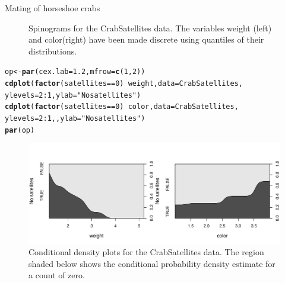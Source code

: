 \documentclass[11pt]{book}\usepackage[]{graphicx}\usepackage[]{color}
\makeatletter
\newcommand{\hlnum}[1]{\textcolor[rgb]{0.686,0.059,0.569}{#1}}%
\newcommand{\hlstr}[1]{\textcolor[rgb]{0.192,0.494,0.8}{#1}}%
\newcommand{\hlopt}[1]{\textcolor[rgb]{0,0,0}{#1}}%
\newcommand{\hlstd}[1]{\textcolor[rgb]{0.345,0.345,0.345}{#1}}%
\newcommand{\hlkwb}[1]{\textcolor[rgb]{0.69,0.353,0.396}{#1}}%
\newcommand{\hlkwc}[1]{\textcolor[rgb]{0.333,0.667,0.333}{#1}}%
\newcommand{\hlkwd}[1]{\textcolor[rgb]{0.737,0.353,0.396}{\textbf{#1}}}%
\newenvironment{kframe}{%
 \def\at@end@of@kframe{}%
 \ifinner\ifhmode%
  \def\at@end@of@kframe{\end{minipage}}%
  \begin{minipage}{\columnwidth}%
 \fi\fi%
 \def\FrameCommand##1{\hskip\@totalleftmargin \hskip-\fboxsep
 \colorbox{shadecolor}{##1}\hskip-\fboxsep
     \hskip-\linewidth \hskip-\@totalleftmargin \hskip\columnwidth}%
 \MakeFramed {\advance\hsize-\width
   \@totalleftmargin\z@ \linewidth\hsize
   \@setminipage}}%
 {\par\unskip\endMakeFramed%
 \at@end@of@kframe}
\newenvironment{knitrout}{}{} %
\renewenvironment{knitrout}{\small\renewcommand{\baselinestretch}{.85}}{} %
\makeatother
\begin{document}
\begin{Example}{Mating of horseshoe crabs}
\begin{knitrout}
\begin{figure}[!htbp]
\caption[Spinograms for the CrabSatellites data]{Spinograms for the CrabSatellites data. The variables weight (left) and color(right) have been made discrete using quantiles of their distributions.\label{fig:crabs-zero-spinogram}}
\end{figure}


\end{knitrout}

\begin{knitrout}
\color{fgcolor}\begin{kframe}
\begin{alltt}
\hlstd{op} \hlkwb{<-} \hlkwd{par}\hlstd{(}\hlkwc{cex.lab}\hlstd{=}\hlnum{1.2}\hlstd{,} \hlkwc{mfrow} \hlstd{=} \hlkwd{c}\hlstd{(}\hlnum{1}\hlstd{,} \hlnum{2}\hlstd{))}
\hlkwd{cdplot}\hlstd{(}\hlkwd{factor}\hlstd{(satellites} \hlopt{==} \hlnum{0}\hlstd{)} \hlopt{~} \hlstd{weight,} \hlkwc{data} \hlstd{= CrabSatellites,}
       \hlkwc{ylevels}\hlstd{=}\hlnum{2}\hlopt{:}\hlnum{1}\hlstd{,} \hlkwc{ylab}\hlstd{=}\hlstr{"No satellites"}\hlstd{)}
\hlkwd{cdplot}\hlstd{(}\hlkwd{factor}\hlstd{(satellites} \hlopt{==} \hlnum{0}\hlstd{)} \hlopt{~} \hlstd{color,} \hlkwc{data} \hlstd{= CrabSatellites,}
       \hlkwc{ylevels}\hlstd{=}\hlnum{2}\hlopt{:}\hlnum{1}\hlstd{, ,} \hlkwc{ylab}\hlstd{=}\hlstr{"No satellites"}\hlstd{)}
\hlkwd{par}\hlstd{(op)}
\end{alltt}
\end{kframe}\begin{figure}[!htbp]


\centerline{\includegraphics[width=\textwidth]{ch09/fig/crabs-zero-cdplot} }

\caption[Conditional density plots for the CrabSatellites data]{Conditional density plots for the CrabSatellites data. The region shaded below shows the conditional probability density estimate for a count of zero.\label{fig:crabs-zero-cdplot}}
\end{figure}


\end{knitrout}


\end{Example}
\end{document}
